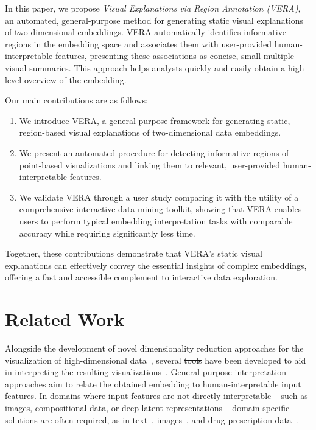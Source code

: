 \documentclass[lettersize,journal]{IEEEtran}
\makeatletter
\providecommand{\DIFadd}[1]{{\protect\color{blue}\uwave{#1}}} %
\providecommand{\DIFdel}[1]{{\protect\color{red}\sout{#1}}} %
\providecommand{\DIFaddbegin}{} %
\providecommand{\DIFaddend}{} %
\providecommand{\DIFdelbegin}{} %
\providecommand{\DIFdelend}{} %
\providecommand{\DIFscaledelfig}{0.5}
\newlength{\DIFdelgraphicswidth} %
\newlength{\DIFdelgraphicsheight} %
\providecommand{\DIFaddincludegraphics}[2][]{{\color{blue}\fbox{\DIFOincludegraphics[#1]{#2}}}} %
\providecommand{\DIFdelincludegraphics}[2][]{%
\sbox{\DIFdelgraphicsbox}{\DIFOincludegraphics[#1]{#2}}%
\settoboxwidth{\DIFdelgraphicswidth}{\DIFdelgraphicsbox} %
\settoboxtotalheight{\DIFdelgraphicsheight}{\DIFdelgraphicsbox} %
\scalebox{\DIFscaledelfig}{%
\parbox[b]{\DIFdelgraphicswidth}{\usebox{\DIFdelgraphicsbox}\\[-\baselineskip] \rule{\DIFdelgraphicswidth}{0em}}\llap{\resizebox{\DIFdelgraphicswidth}{\DIFdelgraphicsheight}{%
\setlength{\unitlength}{\DIFdelgraphicswidth}%
\begin{picture}(1,1)%
\thicklines\linethickness{2pt} %
{\color[rgb]{1,0,0}\put(0,0){\framebox(1,1){}}}%
{\color[rgb]{1,0,0}\put(0,0){\line( 1,1){1}}}%
{\color[rgb]{1,0,0}\put(0,1){\line(1,-1){1}}}%
\end{picture}%
}\hspace*{3pt}}} %
} %
\DeclareRobustCommand{\DIFaddbegin}{\DIFOaddbegin \let\includegraphics\DIFaddincludegraphics} %
\DeclareRobustCommand{\DIFaddend}{\DIFOaddend \let\includegraphics\DIFOincludegraphics} %
\DeclareRobustCommand{\DIFdelbegin}{\DIFOdelbegin \let\includegraphics\DIFdelincludegraphics} %
\DeclareRobustCommand{\DIFdelend}{\DIFOaddend \let\includegraphics\DIFOincludegraphics} %
\let\sout@orig\sout %
\renewcommand{\sout}[1]{\ifmmode\text{\sout@orig{\ensuremath{#1}}}\else\sout@orig{#1}\fi} %
\makeatother
\begin{document}
In this paper, we propose \textit{Visual Explanations via Region Annotation (VERA)}, an automated, general-purpose method for generating static visual explanations of two-dimensional embeddings. VERA automatically identifies informative regions in the embedding space and associates them with \DIFaddbegin \DIFadd{a smaller set of }\DIFaddend user-provided human-interpretable features, presenting these associations as concise, small-multiple visual summaries. This approach helps analysts quickly and easily obtain a high-level overview of the embedding.

Our main contributions are as follows:
\begin{enumerate}
  \item We introduce VERA, a general-purpose framework for generating static, region-based visual explanations of two-dimensional data embeddings.
  \item We present an automated procedure for detecting informative regions of point-based visualizations and linking them to relevant, user-provided human-interpretable features.
  \item We validate VERA through a user study comparing it with the utility of a comprehensive interactive data mining toolkit, showing that VERA enables users to perform typical embedding interpretation tasks with comparable accuracy while requiring significantly less time.
\end{enumerate}

Together, these contributions demonstrate that VERA’s static visual explanations can effectively convey the essential insights of complex embeddings, offering a fast and accessible complement to interactive data exploration.

\section{Related Work}
\label{sec:related_work}

Alongside the development of novel dimensionality reduction approaches for the visualization of high-dimensional data~\cite{Kruskal1978,Maaten2008,McInnes2018}, several \DIFdelbegin \DIFdel{tools }\DIFdelend \DIFaddbegin \DIFadd{methods }\DIFaddend have been developed to aid in interpreting the resulting visualizations~\cite{ChengMueller2016,Marcilio2021,Fujiwara2020}.
General-purpose interpretation approaches aim to relate the obtained embedding to human-interpretable input features.
In domains where input features are not directly interpretable -- such as images, compositional data, or deep latent representations -- domain-specific solutions are often required, as in text~\cite{Heimerl2016,WangHohmanChau2023}, images~\cite{Liu2019,Ye2024}, and drug-prescription data~\cite{Policar2023}.
\end{document}
